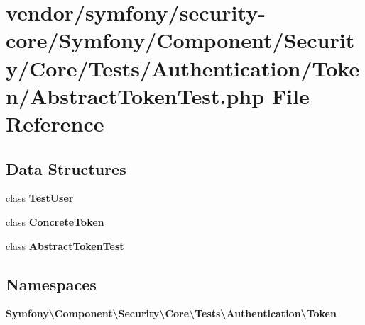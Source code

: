 \section{vendor/symfony/security-\/core/\+Symfony/\+Component/\+Security/\+Core/\+Tests/\+Authentication/\+Token/\+Abstract\+Token\+Test.php File Reference}
\label{_abstract_token_test_8php}
\subsection*{Data Structures}
\begin{DoxyCompactItemize}
\item 
class {\bf Test\+User}
\item 
class {\bf Concrete\+Token}
\item 
class {\bf Abstract\+Token\+Test}
\end{DoxyCompactItemize}
\subsection*{Namespaces}
\begin{DoxyCompactItemize}
\item 
 {\bf Symfony\textbackslash{}\+Component\textbackslash{}\+Security\textbackslash{}\+Core\textbackslash{}\+Tests\textbackslash{}\+Authentication\textbackslash{}\+Token}
\end{DoxyCompactItemize}
